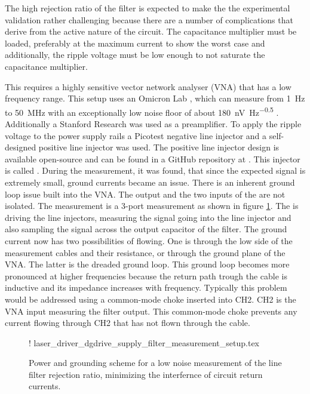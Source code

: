The high rejection ratio of the filter is expected to make the the experimental validation rather challenging because there are a number of complications that derive from the active nature of the circuit. The capacitance multiplier must be loaded, preferably at the maximum current to show the worst case and additionally, the ripple voltage must be low enough to not saturate the capacitance multiplier.

This requires a highly sensitive vector network analyser (VNA) that has a low frequency range. This setup uses an Omicron Lab , which can measure from \qty{1}{\Hz} to \qty{50}{\MHz} with an exceptionally low noise floor of about \qty[power-half-as-sqrt, per-mode=symbol]{180}{\nV \Hz\tothe{-0.5}} \cite{datasheet_bode100}. Additionally a Stanford Research  was used as a preamplifier. To apply the ripple voltage to the power supply rails a Picotest  negative line injector and a self-designed positive line injector was used. The positive line injector design is available open-source and can be found in a GitHub repository at \cite{line_injector_github}. This injector is called . During the measurement, it was found, that since the expected signal is extremely small, ground currents became an issue. There is an inherent ground loop issue built into the VNA. The output and the two inputs of the  are not isolated. The measurement is a 3-port measurement as shown in figure \ref{fig:laser_driver_supply_filter_measurement}. The  is driving the line injectors, measuring the signal going into the line injector and also sampling the signal across the output capacitor of the filter. The ground current now has two possibilities of flowing. One is through the low side of the measurement cables and their resistance, or through the ground plane of the VNA. The latter is the dreaded ground loop. This ground loop becomes more pronounced at higher frequencies because the return path trough the cable is inductive and its impedance increases with frequency. Typically this problem would be addressed using a common-mode choke inserted into CH2. CH2 is the VNA input measuring the filter output. This common-mode choke prevents any current flowing through CH2 that has not flown through the cable.
\begin{figure}[ht]
    \centering
     {!} {
        {laser_driver_dgdrive_supply_filter_measurement_setup.tex}
    } %
    \caption{Power and grounding scheme for a low noise measurement of the line filter rejection ratio, minimizing the interfernce of circuit return currents.}
    \label{fig:laser_driver_supply_filter_measurement}
\end{figure}

